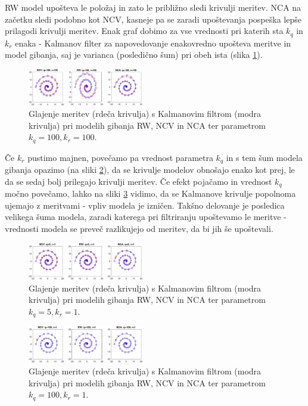 \documentclass[a4paper]{article}
\begin{document}
RW model upošteva le položaj in zato le približno sledi krivulji meritev. 
NCA na začetku sledi podobno kot NCV, kasneje pa se zaradi upoštevanja pospeška lepše prilagodi krivulji meritev. Enak graf dobimo za vse vrednosti pri katerih sta $k_q$ in $k_r$ enaka - Kalmanov filter za napovedovanje enakovredno upošteva meritve in model gibanja, saj je varianca (posledično šum) pri obeh ista (slika  \ref{q100r100}).
\begin{figure}[h]
	\begin{center}
		\includegraphics [width=0.45\textwidth] {q100r100.pdf}
	\end{center}
	\caption{Glajenje meritev (rdeča krivulja) s Kalmanovim filtrom (modra krivulja) pri modelih gibanja RW, NCV in NCA ter parametrom $k_q=100, k_r=100$. }
	\label{q100r100}
\end{figure}  

Če $k_r$ pustimo majnen, povečamo pa vrednost parametra $k_q$ in s tem šum modela gibanja opazimo (na sliki \ref{q5r1}), da se krivulje modelov obnošajo enako kot prej, le da se sedaj bolj prilegajo krivulji meritev. Če efekt pojačamo in vrednost $k_q$ močno povečamo, lahko na sliki \ref{q100r1} vidimo, da se Kalmanove krivulje popolnoma ujemajo z meritvami - vpliv modela je izničen. Takšno delovanje je posledica velikega šuma modela, zaradi katerega pri filtriranju upoštevamo le meritve - vrednosti modela se preveč razlikujejo od meritev, da bi jih še upoštevali.
\begin{figure}[h]
	\begin{center}
		\includegraphics [width=0.45\textwidth] {q5r1.pdf}
	\end{center}
	\caption{Glajenje meritev (rdeča krivulja) s Kalmanovim filtrom (modra krivulja) pri modelih gibanja RW, NCV in NCA ter parametrom $k_q=5, k_r=1$. }
	\label{q5r1}
\end{figure} 
\begin{figure}[h]
	\begin{center}
		\includegraphics [width=0.45\textwidth] {q100r1.pdf}
	\end{center}
	\caption{Glajenje meritev (rdeča krivulja) s Kalmanovim filtrom (modra krivulja) pri modelih gibanja RW, NCV in NCA ter parametrom $k_q=100, k_r=1$. }
	\label{q100r1}
\end{figure}   
\end{document}
